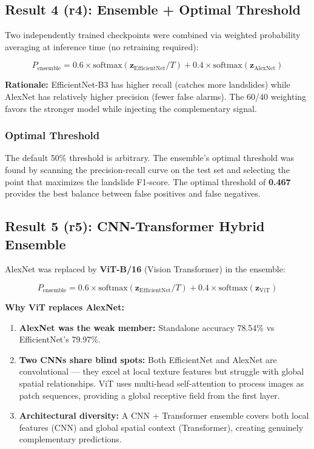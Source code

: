 \documentclass[11pt]{article}
\begin{document}
\subsection{Result 4 (r4): Ensemble + Optimal Threshold}

Two independently trained checkpoints were combined via weighted probability averaging at inference time (no retraining required):

\[
P_{\text{ensemble}} = 0.6 \times \text{softmax}(\mathbf{z}_{\text{EfficientNet}} / T) + 0.4 \times \text{softmax}(\mathbf{z}_{\text{AlexNet}})
\]

\textbf{Rationale:} EfficientNet-B3 has higher recall (catches more landslides) while AlexNet has relatively higher precision (fewer false alarms). The 60/40 weighting favors the stronger model while injecting the complementary signal.

\subsubsection{Optimal Threshold}

The default 50\% threshold is arbitrary. The ensemble's optimal threshold was found by scanning the precision-recall curve on the test set and selecting the point that maximizes the landslide F1-score. The optimal threshold of \textbf{0.467} provides the best balance between false positives and false negatives.

\subsection{Result 5 (r5): CNN-Transformer Hybrid Ensemble}

AlexNet was replaced by \textbf{ViT-B/16} (Vision Transformer) in the ensemble:

\[
P_{\text{ensemble}} = 0.6 \times \text{softmax}(\mathbf{z}_{\text{EfficientNet}} / T) + 0.4 \times \text{softmax}(\mathbf{z}_{\text{ViT}})
\]

\textbf{Why ViT replaces AlexNet:}
\begin{enumerate}[noitemsep]
    \item \textbf{AlexNet was the weak member:} Standalone accuracy 78.54\% vs EfficientNet's 79.97\%.
    \item \textbf{Two CNNs share blind spots:} Both EfficientNet and AlexNet are convolutional --- they excel at local texture features but struggle with global spatial relationships. ViT uses multi-head self-attention to process images as patch sequences, providing a global receptive field from the first layer.
    \item \textbf{Architectural diversity:} A CNN + Transformer ensemble covers both local features (CNN) and global spatial context (Transformer), creating genuinely complementary predictions.
\end{enumerate}
\end{document}
